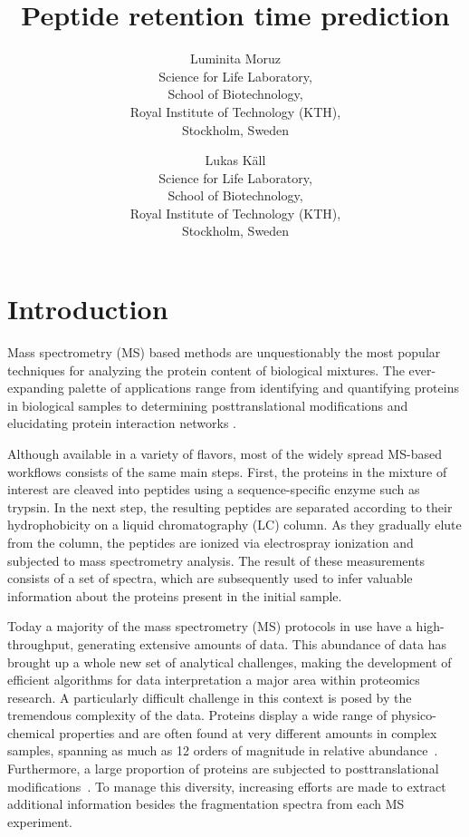 \documentclass[a4paper]{article}
\title{Peptide retention time prediction}
\author{
Luminita Moruz\\
Science for Life Laboratory,\\
School of Biotechnology,\\
Royal Institute of Technology (KTH),\\
Stockholm, Sweden
\and
Lukas K\"{a}ll\\
Science for Life Laboratory,\\
School of Biotechnology,\\
Royal Institute of Technology (KTH),\\
Stockholm, Sweden}
\begin{document}
\maketitle

\setcounter{secnumdepth}{2} %
\setcounter{tocdepth}{2}    %
\tableofcontents            %

\setlength{\parskip}{0.15cm}

\section{Introduction}

Mass spectrometry (MS) based methods are unquestionably the most
popular techniques for analyzing the protein content of biological
mixtures.  The ever-expanding palette of applications range from
identifying and quantifying proteins in biological samples
\cite{Geiger2012} to determining posttranslational modifications
\cite{Huttlin2010} and elucidating protein interaction networks
\cite{Gavin2011}.

Although available in a variety of flavors, most of the widely spread
MS-based workflows consists of the same main steps. First, the
proteins in the mixture of interest are cleaved into peptides using a
sequence-specific enzyme such as trypsin. In the next step, the
resulting peptides are separated according to their hydrophobicity on
a liquid chromatography (LC) column. As they gradually elute from the
column, the peptides are ionized via electrospray ionization and
subjected to mass spectrometry analysis. The result of these
measurements consists of a set of spectra, which are subsequently used
to infer valuable information about the proteins present in the
initial sample.

Today a majority of the mass spectrometry (MS) protocols in use have a
high-throughput, generating extensive amounts of data. This abundance
of data has brought up a whole new set of analytical challenges,
making the development of efficient algorithms for data interpretation
a major area within proteomics research. A particularly difficult
challenge in this context is posed by the tremendous complexity of the
data.  Proteins display a wide range of physico-chemical properties
and are often found at very different amounts in complex samples,
spanning as much as 12 orders of magnitude in relative
abundance~\cite{Angel2012}.  Furthermore, a large proportion of
proteins are subjected to posttranslational
modifications~\cite{Lemeer2009}. To manage this diversity, increasing
efforts are made to extract additional information besides the
fragmentation spectra from each MS experiment.
\end{document}
